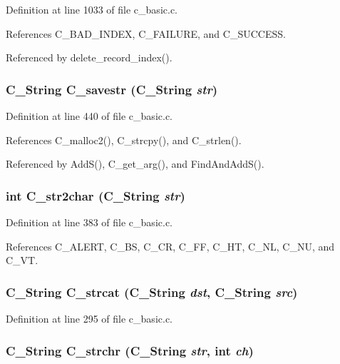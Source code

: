Definition at line 1033 of file c\_\-basic.c.

References C\_\-BAD\_\-INDEX, C\_\-FAILURE, and C\_\-SUCCESS.

Referenced by delete\_\-record\_\-index().
\subsubsection{\setlength{\rightskip}{0pt plus 5cm}\bf{C\_\-String} C\_\-savestr (\bf{C\_\-String} {\em str})}\label{c__basic_8h_afdb1c4e6c3f0f7ba69205d57a1f4e21}




Definition at line 440 of file c\_\-basic.c.

References C\_\-malloc2(), C\_\-strcpy(), and C\_\-strlen().

Referenced by Add\-S(), C\_\-get\_\-arg(), and Find\-And\-Add\-S().
\subsubsection{\setlength{\rightskip}{0pt plus 5cm}int C\_\-str2char (\bf{C\_\-String} {\em str})}\label{c__basic_8h_4012afc330a3a23981bee97d4fd284f7}




Definition at line 383 of file c\_\-basic.c.

References C\_\-ALERT, C\_\-BS, C\_\-CR, C\_\-FF, C\_\-HT, C\_\-NL, C\_\-NU, and C\_\-VT.
\subsubsection{\setlength{\rightskip}{0pt plus 5cm}\bf{C\_\-String} C\_\-strcat (\bf{C\_\-String} {\em dst}, \bf{C\_\-String} {\em src})}\label{c__basic_8h_57567176a12611bb33df586d84c3b693}




Definition at line 295 of file c\_\-basic.c.
\subsubsection{\setlength{\rightskip}{0pt plus 5cm}\bf{C\_\-String} C\_\-strchr (\bf{C\_\-String} {\em str}, int {\em ch})}\label{c__basic_8h_7fb17d02326bcd719ae51fdb0cb67675}




